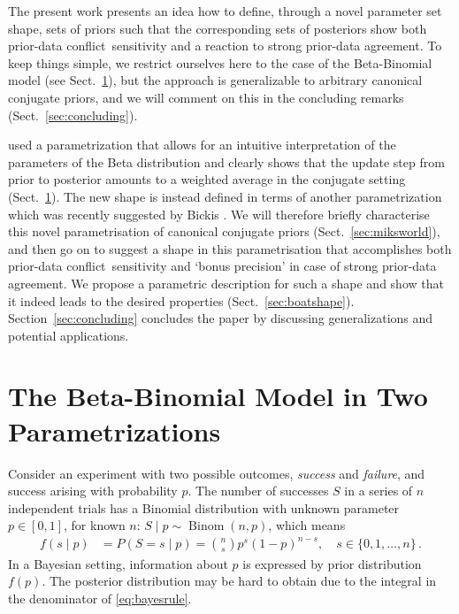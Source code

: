 \documentclass[runningheads,a4paper]{llncs}
\def\pdc{prior-data conflict}
\newcommand{\bin}{\operatorname{Binom}} %
\begin{document}
The present work presents an idea how to define, through a novel parameter set shape,
sets of priors such that the corresponding sets of posteriors
show both \pdc\ sensitivity and a reaction to strong prior-data agreement.
To keep things simple, we restrict ourselves here to the case of the Beta-Binomial model (see Sect.~\ref{sec:beta-binom}),
but the approach is generalizable to arbitrary canonical conjugate priors,
and we will comment on this in the concluding remarks (Sect.~\ref{sec:concluding}).

\cite{Walter2009a} used a parametrization 
that allows for an intuitive interpretation of the parameters of the Beta distribution
and clearly shows that the update step from prior to posterior
amounts to a weighted average in the conjugate setting (Sect.~\ref{sec:beta-binom}).
The new shape is instead defined in terms of another parametrization
which was recently suggested by Bickis \cite{2015:mik-isipta}.
We will therefore briefly characterise this novel parametrisation of canonical conjugate priors (Sect.~\ref{sec:miksworld}),
and then go on to suggest a shape in this parametrisation that accomplishes
both \pdc\ sensitivity and `bonus precision' in case of strong prior-data agreement.
We propose a parametric description for such a shape
and show that it indeed leads to the desired properties (Sect.~\ref{sec:boatshape}).
Section~\ref{sec:concluding} concludes the paper by discussing generalizations and potential applications. 






\section{The Beta-Binomial Model in Two Parametrizations}
\label{sec:beta-binom}

Consider an experiment with two possible outcomes,
\emph{success} and \emph{failure}, and success arising with probability $p$.
The number of successes $S$ in a series of $n$ independent trials
has a Binomial distribution with unknown parameter $p\in [0,1]$, for 
known $n$: $S\mid p \sim \bin(n,p)$, which means
\begin{align}
f(s\mid p) &= P(S = s \mid p) = {n \choose s} p^s (1-p)^{n-s},\quad s \in \{0, 1, \ldots, n\}\,.
\label{eq:binompmf}
\end{align}
In a Bayesian setting, information about $p$ is expressed by prior distribution $f(p)$.
The posterior distribution may be hard to obtain due to the integral in the denominator of \eqref{eq:bayesrule}.
\end{document}
